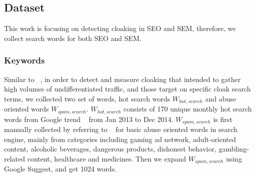 %
%
%                                       
%
%
%
%
%
%
%

\subsection{Dataset}
\label{ss:dataset}
This work is focusing on detecting cloaking in SEO and SEM, therefore, we
collect search words for both SEO and SEM.

\subsubsection{Keywords}
Similar to ~\cite{wang2011cloak},
in order to detect and measure cloaking that intended to gather high volumes of
undifferentiated traffic, and those target on specific cloak search terms, we
collected two set of words, hot search words $W_{hot, search}$ and abuse
oriented words $W_{spam, search}$. $W_{hot, search}$ consists of 170
unique monthly hot search words
from Google trend ~\cite{google-trend} from Jan 2013 to Dec 2014. $W_{spam,
search}$ is first manually collected by referring to ~\cite{google-ad-policy} for
basic abuse oriented words in search engine, mainly from categories including
gaming ad network, adult-oriented content, alcoholic beverages,
dangerous products, dishonest behavior,
gambling-related content, healthcare and medicines. Then we expand $W_{spam,
search}$ using Google Suggest, and get 1024 words.


